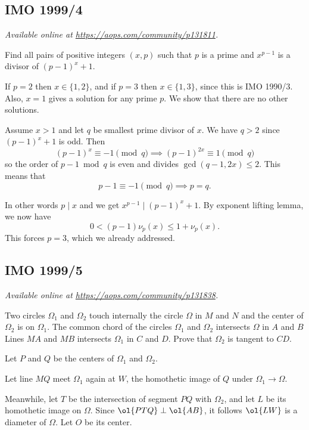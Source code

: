 \documentclass[11pt]{scrartcl}
\begin{document}
\subsection{IMO 1999/4}
\textsl{Available online at \url{https://aops.com/community/p131811}.}
\begin{mdframed}[style=mdpurplebox,frametitle={Problem statement}]
Find all pairs of positive integers $(x,p)$
such that $p$ is a prime and $x^{p-1}$ is a divisor of $ (p-1)^{x}+1$.
\end{mdframed}
If $p = 2$ then $x \in \{1,2\}$,
and if $p = 3$ then $x \in \{1,3\}$, since this is IMO 1990/3.
Also, $x = 1$ gives a solution for any prime $p$.
We show that there are no other solutions.

Assume $x > 1$ and let $q$ be smallest prime divisor of $x$.
We have $q > 2$ since $(p-1)^x+1$ is odd.
Then
\[ (p-1)^x \equiv -1 \pmod q \implies (p-1)^{2x} \equiv 1 \pmod q \]
so the order of $p-1 \bmod q$ is even and divides $\gcd(q-1,2x) \le 2$.
This means that
\[ p-1 \equiv -1 \pmod q \implies p = q. \]

In other words $p \mid x$ and we get $x^{p-1} \mid (p-1)^{x}+1$.
By exponent lifting lemma, we now have
\[ 0 < (p-1) \nu_{p}(x) \le 1 + \nu_p(x). \]
This forces $p=3$,
which we already addressed.
\pagebreak

\subsection{IMO 1999/5}
\textsl{Available online at \url{https://aops.com/community/p131838}.}
\begin{mdframed}[style=mdpurplebox,frametitle={Problem statement}]
Two circles $\Omega_{1}$ and $\Omega_{2}$ touch internally the circle
$\Omega$ in $M$ and $N$ and the center of $\Omega_{2}$ is on $\Omega_{1}$.
The common chord of the circles $\Omega_{1}$ and $\Omega_{2}$
intersects $\Omega$ in $A$ and $B$
Lines $MA$ and $MB$ intersects $\Omega_{1}$ in $C$ and $D$.
Prove that $\Omega_{2}$ is tangent to $CD$.
\end{mdframed}
Let $P$ and $Q$ be the centers of $\Omega_1$ and $\Omega_2$.

Let line $MQ$ meet $\Omega_1$ again at $W$,
the homothetic image of $Q$ under $\Omega_1 \to \Omega$.

Meanwhile, let $T$ be the intersection of segment $PQ$
with $\Omega_2$, and let $L$ be its homothetic image on $\Omega$.
Since $\ol{PTQ} \perp \ol{AB}$, it follows $\ol{LW}$
is a diameter of $\Omega$.
Let $O$ be its center.
\end{document}
